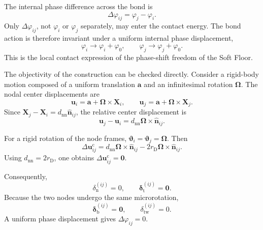 The internal phase difference across the bond is
\begin{equation}
    \boxed{ \Delta\varphi_{ij} = \varphi_j-\varphi_i }.
\end{equation}
Only $\Delta\varphi_{ij}$, not $\varphi_i$ or $\varphi_j$ separately, may enter the contact energy. The bond action is therefore invariant under a uniform internal phase displacement,
\begin{equation}
    \varphi_i\rightarrow\varphi_i+\varphi_0, \qquad \varphi_j\rightarrow\varphi_j+\varphi_0.
\end{equation}
This is the local contact expression of the phase-shift freedom of the Soft Floor.

The objectivity of the construction can be checked directly. Consider a rigid-body motion composed of a uniform translation $\mathbf{a}$ and an infinitesimal rotation $\boldsymbol{\Omega}$. The nodal center displacements are
\begin{equation}
    \mathbf{u}_i = \mathbf{a}+\boldsymbol{\Omega}\times\mathbf{X}_i, \qquad \mathbf{u}_j = \mathbf{a}+\boldsymbol{\Omega}\times\mathbf{X}_j.
\end{equation}
Since $\mathbf{X}_j-\mathbf{X}_i = d_{\mathrm{nn}}\hat{\mathbf{n}}_{ij}$, the relative center displacement is
\begin{equation}
    \mathbf{u}_j-\mathbf{u}_i = d_{\mathrm{nn}} \boldsymbol{\Omega}\times\hat{\mathbf{n}}_{ij}.
\end{equation}

For a rigid rotation of the node frames, $\boldsymbol{\vartheta}_i = \boldsymbol{\vartheta}_j = \boldsymbol{\Omega}$. Then
\begin{equation}
    \Delta\mathbf{u}_{ij}^{\mathrm{c}} = d_{\mathrm{nn}} \boldsymbol{\Omega}\times\hat{\mathbf{n}}_{ij} - 2r_{\mathrm{D}} \boldsymbol{\Omega}\times\hat{\mathbf{n}}_{ij}.
\end{equation}
Using $d_{\mathrm{nn}}=2r_{\mathrm{D}}$, one obtains $\Delta\mathbf{u}_{ij}^{\mathrm{c}} = \mathbf{0}$.

Consequently,
\begin{equation}
    \delta_{\mathrm{n}}^{(ij)}=0, \qquad \boldsymbol{\delta}_{\mathrm{t}}^{(ij)}=\mathbf{0}.
\end{equation}
Because the two nodes undergo the same microrotation,
\begin{equation}
    \boldsymbol{\delta}_{\mathrm{b}}^{(ij)}=\mathbf{0}, \qquad \delta_{\mathrm{tw}}^{(ij)}=0.
\end{equation}
A uniform phase displacement gives $\Delta\varphi_{ij}=0$.

